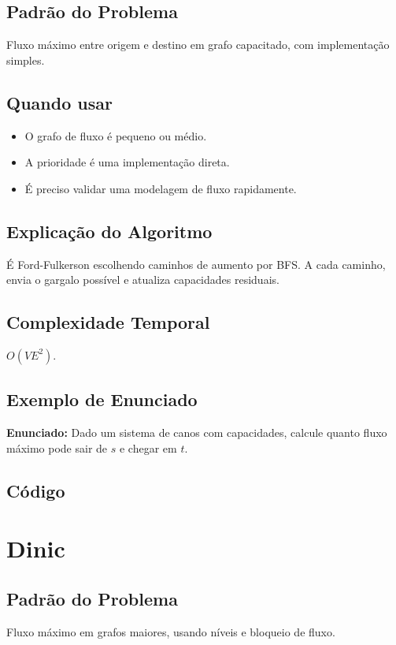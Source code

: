 \subsection{Padrão do Problema}
Fluxo máximo entre origem e destino em grafo capacitado, com implementação simples.

\subsection{Quando usar}
\begin{itemize}[nosep]
  \item O grafo de fluxo é pequeno ou médio.
  \item A prioridade é uma implementação direta.
  \item É preciso validar uma modelagem de fluxo rapidamente.
\end{itemize}

\subsection{Explicação do Algoritmo}
É Ford-Fulkerson escolhendo caminhos de aumento por BFS. A cada caminho, envia o gargalo possível e atualiza capacidades residuais.

\subsection{Complexidade Temporal}
$O(VE^2)$.

\subsection{Exemplo de Enunciado}
\begin{exemplodiabox}
\textbf{Enunciado:} Dado um sistema de canos com capacidades, calcule quanto fluxo máximo pode sair de $s$ e chegar em $t$.
\end{exemplodiabox}

\subsection{Código}

\section{Dinic}

\subsection{Padrão do Problema}
Fluxo máximo em grafos maiores, usando níveis e bloqueio de fluxo.

